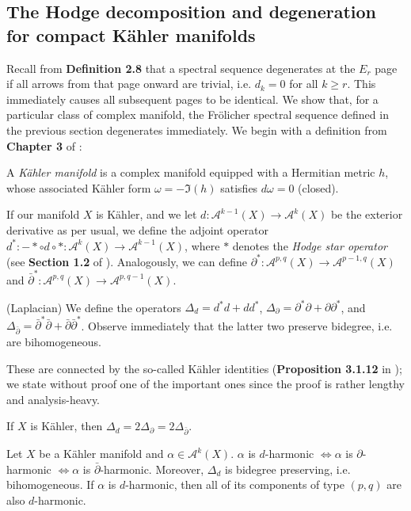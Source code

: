 \subsection{The Hodge decomposition and degeneration for compact K\"ahler manifolds}
Recall from \textbf{Definition 2.8} that a spectral sequence degenerates at the $E_r$ page if all arrows from that page onward are trivial, i.e. $d_k=0$ for all $k\geq r$. This immediately causes all subsequent pages to be identical. We show that, for a particular class of complex manifold, the Fr\"olicher spectral sequence defined in the previous section degenerates immediately. We begin with a definition from \textbf{Chapter 3} of \cite{VoisinI2002}:

\begin{definition}
    A \emph{K\"ahler manifold} is a complex manifold equipped with a Hermitian metric $h$, whose associated K\"ahler form $\omega = -\Im(h)$ satisfies $d\omega =0$ (closed). 
\end{definition}

\noindent If our manifold $X$ is K\"ahler, and we let $d:\mathcal{A}^{k-1}(X) \to \mathcal{A}^k(X)$ be the exterior derivative as per usual, we define the adjoint operator $d^*: -*\circ d\circ *:\mathcal{A}^k(X) \to \mathcal{A}^{k-1}(X)$, where $*$ denotes the \emph{Hodge star operator} (see \textbf{Section 1.2} of \cite{Huybrechts2005}). Analogously, we can define $\partial^*:\mathcal{A}^{p,q}(X) \to \mathcal{A}^{p-1,q}(X)$ and $\bar\partial^*:\mathcal{A}^{p,q}(X) \to \mathcal{A}^{p,q-1}(X)$.

\begin{definition}
    (Laplacian) We define the operators $\Delta_d = d^*d + dd^*$, $\Delta_\partial = \partial^*\partial+\partial\partial^*$, and $\Delta_{\bar \partial} = \bar\partial^*\bar\partial + \bar\partial \bar\partial^*$. Observe immediately that the latter two preserve bidegree, i.e. are bihomogeneous.
\end{definition}

\noindent These are connected by the so-called K\"ahler identities (\textbf{Proposition 3.1.12} in \cite{Huybrechts2005}); we state without proof one of the important ones since the proof is rather lengthy and analysis-heavy.

\begin{lemma}
If $X$ is K\"ahler, then $\Delta_d = 2\Delta_\partial = 2\Delta_{\bar \partial}$.
\end{lemma}

\begin{corollary}
    Let $X$ be a K\"ahler manifold and $\alpha\in \mathcal{A}^k(X)$. $\alpha$ is $d$-harmonic $\iff \alpha$ is $\partial$-harmonic $\iff \alpha$ is $\bar\partial$-harmonic. Moreover, $\Delta_d$ is bidegree preserving, i.e. bihomogeneous. If $\alpha$ is $d$-harmonic, then all of its components of type $(p,q)$ are also $d$-harmonic. 
\end{corollary}

